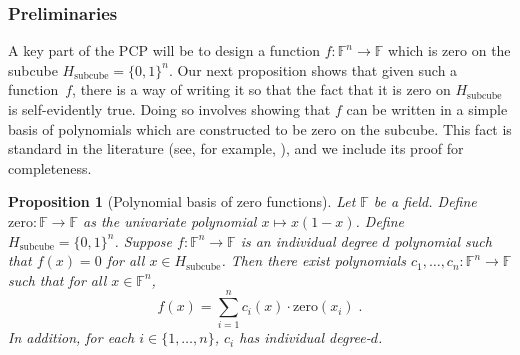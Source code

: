\documentclass[11pt]{article}
\newtheorem{proposition}[theorem]{Proposition}
\theoremstyle{definition}
\newcommand{\F}{\ensuremath{\mathbb{F}}}
\begin{document}
\subsubsection{Preliminaries}

A key part of the PCP will be to design a function $f:\F^n \rightarrow \F$ which
is zero on the subcube $H_{\mathrm{subcube}} = \{0,1\}^n$.
Our next proposition shows that given such a function~$f$, there is a way of
writing it so that the fact that it is zero on $H_{\mathrm{subcube}}$ is
self-evidently true.
Doing so involves showing that $f$ can be written in a simple basis of
polynomials which are constructed to be zero on the subcube.
This fact is standard in the literature (see, for example,
\cite[Lemma~$4.11$]{ben2008short}), and we include its proof for
completeness.

\begin{proposition}[Polynomial basis of zero functions]\label{prop:zero-basis}
  Let $\F$ be a field.
  Define $\mathrm{zero}: \F \to \F$ as the univariate polynomial $x \mapsto
  x(1-x)$.
Define $H_{\mathrm{subcube}} = \{0,1\}^n$.
  Suppose $f:\F^n \rightarrow \F$ is an individual degree $d$ polynomial such
  that $f(x) = 0$ for all $x \in H_{\mathrm{subcube}}$.
  Then there exist polynomials $c_1, \ldots, c_n:\F^n \rightarrow \F$ such that
  for all $x \in \F^n$,
  \begin{equation*}
  f(x) = \sum_{i=1}^n c_i(x) \cdot \mathrm{zero}(x_i)\;.
  \end{equation*}
  In addition, for each $i \in \{1, \ldots, n\}$, $c_i$ has individual degree-$d$. 
\end{proposition}
  
\end{document}
